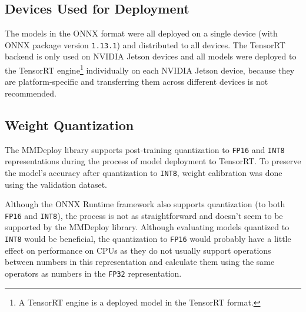 \subsection*{Devices Used for Deployment}

The models in the ONNX format were all deployed on a single device (with ONNX
package version \texttt{1.13.1}) and distributed to all devices. The TensorRT
backend is only used on NVIDIA Jetson devices and all models were deployed to
the TensorRT engine\footnote{A TensorRT engine is a deployed model in the
TensorRT format.} individually on each NVIDIA Jetson device, because they are
platform-specific and transferring them across different devices is not
recommended.




\subsection*{Weight Quantization}

The MMDeploy library supports post-training quantization to \texttt{FP16} and
\texttt{INT8} representations during the process of model deployment to
TensorRT. To preserve the model's accuracy after quantization to \texttt{INT8},
weight calibration was done using the validation dataset.

Although the ONNX Runtime framework also supports quantization (to both
\texttt{FP16} and \texttt{INT8}), the process is not as straightforward and
doesn't seem to be supported by the MMDeploy library. Although evaluating models
quantized to \texttt{INT8} would be beneficial, the quantization to
\texttt{FP16} would probably have a little effect on performance on CPUs as they
do not usually support operations between numbers in this representation and
calculate them using the same operators as numbers in the \texttt{FP32}
representation.

